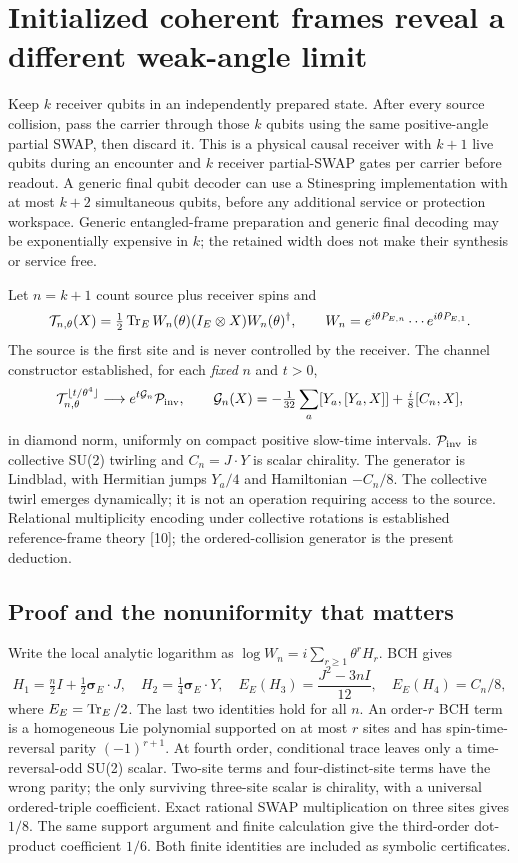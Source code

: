 \section{Initialized coherent frames reveal a different weak-angle limit}
Keep $k$ receiver qubits in an independently prepared state. After every
source collision, pass the carrier through those $k$ qubits using the same
positive-angle partial SWAP, then discard it. This is a physical causal
receiver with $k+1$ live qubits during an encounter and $k$ receiver
partial-SWAP gates per carrier before readout. A generic final qubit decoder
can use a Stinespring implementation with at most $k+2$ simultaneous qubits,
before any additional service or protection workspace. Generic entangled-frame
preparation and generic final decoding may be exponentially expensive in
$k$; the retained width does not make their synthesis or service free.

Let $n=k+1$ count source plus receiver spins and
\[
 \mathcal T_{n,\theta}(X)=\tfrac12\operatorname{Tr}_E
 W_n(\theta)(I_E\otimes X)W_n(\theta)^\dagger,
 \qquad W_n=e^{i\theta P_{E,n}}\cdots e^{i\theta P_{E,1}}.
\]
The source is the first site and is never controlled by the receiver.
The channel constructor established, for each \emph{fixed} $n$ and $t>0$,
\begin{equation}
 \mathcal T_{n,\theta}^{\lfloor t/\theta^4\rfloor}
 \longrightarrow e^{t\mathcal G_n}\mathcal P_{\rm inv},\qquad
 \mathcal G_n(X)=-\tfrac1{32}\sum_a[Y_a,[Y_a,X]]
 +\tfrac i8[C_n,X],\label{eq:slowgenerator}
\end{equation}
in diamond norm, uniformly on compact positive slow-time intervals.
$\mathcal P_{\rm inv}$ is collective SU(2) twirling and $C_n=J\cdot Y$
is scalar chirality. The generator is Lindblad, with Hermitian jumps $Y_a/4$
and Hamiltonian $-C_n/8$. The collective twirl emerges dynamically; it is
not an operation requiring access to the source. Relational multiplicity
encoding under collective rotations is established reference-frame theory
[10]; the ordered-collision generator is the present deduction.

\subsection{Proof and the nonuniformity that matters}
Write the local analytic logarithm as
$\log W_n=i\sum_{r\ge1}\theta^rH_r$. BCH gives
\[
 H_1=\tfrac n2I+\tfrac12\boldsymbol\sigma_E\cdot J,
 \quad H_2=\tfrac14\boldsymbol\sigma_E\cdot Y,
 \quad E_E(H_3)=\frac{J^2-3nI}{12},
 \quad E_E(H_4)=C_n/8,
\]
where $E_E=\operatorname{Tr}_E/2$. The last two identities hold for all $n$.
An order-$r$ BCH term is a homogeneous Lie polynomial supported on at most
$r$ sites and has spin-time-reversal parity $(-1)^{r+1}$. At fourth order,
conditional trace leaves only a time-reversal-odd SU(2) scalar. Two-site
terms and four-distinct-site terms have the wrong parity; the only surviving
three-site scalar is chirality, with a universal ordered-triple coefficient.
Exact rational SWAP multiplication on three sites gives $1/8$. The same
support argument and finite calculation give the third-order dot-product
coefficient $1/6$. Both finite identities are included as symbolic certificates.

